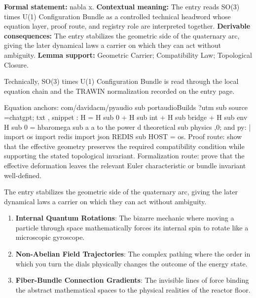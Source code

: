 \begingroup\footnotesize\setlength{\emergencystretch}{3em}\sloppy
\textbf{Formal statement:} nabla x. \textbf{Contextual meaning:} The entry reads SO(3) times U(1) Configuration Bundle as a controlled technical headword whose equation layer, proof route, and registry role are interpreted together. \textbf{Derivable consequences:} The entry stabilizes the geometric side of the quaternary arc, giving the later dynamical laws a carrier on which they can act without ambiguity. \textbf{Lemma support:} Geometric Carrier; Compatibility Law; Topological Closure.\par
\endgroup

Technically, SO(3) times U(1) Configuration Bundle is read through the local equation chain and the TRAWIN normalization recorded on the entry page.

Equation anchors: com/davidacm/pyaudio sub portaudioBuilds ?utm sub source =chatgpt; txt , snippet : H = H sub 0 + H sub int + H sub bridge + H sub env H sub 0 = hbaromega sub a a to the power d theoretical sub physics ,0; and py: | import os import redis import json REDIS sub HOST = os. Proof route: show that the effective geometry preserves the required compatibility condition while supporting the stated topological invariant. Formalization route: prove that the effective deformation leaves the relevant Euler characteristic or bundle invariant well-defined.

The entry stabilizes the geometric side of the quaternary arc, giving the later dynamical laws a carrier on which they can act without ambiguity.
\endgroup

\begin{enumerate}[leftmargin=1.6em,itemsep=6pt,topsep=4pt]
\item \textbf{Internal Quantum Rotations}: The bizarre mechanic where moving a particle through space mathematically forces its internal spin to rotate like a microscopic gyroscope.
\item \textbf{Non-Abelian Field Trajectories}: The complex pathing where the order in which you turn the dials physically changes the outcome of the energy state.
\item \textbf{Fiber-Bundle Connection Gradients}: The invisible lines of force binding the abstract mathematical spaces to the physical realities of the reactor floor.
\end{enumerate}

